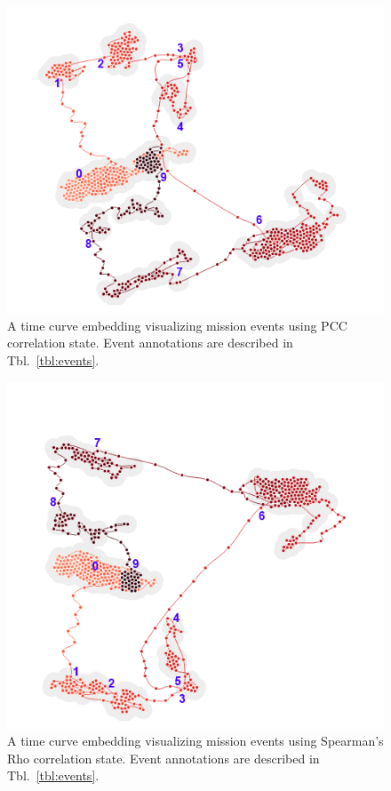 \begin{figure}[h]
\centering
    \includegraphics{images/pfm2_pcc_time_curve_annotated.png}
    \caption{A time curve embedding visualizing mission events using PCC correlation state. Event annotations are described in Tbl.~\ref{tbl:events}.}
    \label{fig:pfm2_pcc_time_curve_annotated}
\end{figure}

\begin{figure}[h]
\centering
    \includegraphics{images/pfm2_rho_time_curve_annotated.png}
    \caption{A time curve embedding visualizing mission events using Spearman's Rho correlation state. Event annotations are described in Tbl.~\ref{tbl:events}.}
    \label{fig:pfm2_rho_time_curve_annotated}
\end{figure}

